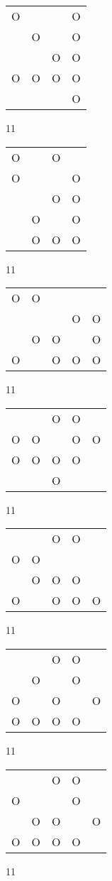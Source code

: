 \begin{tabular}{|m{0.2cm}m{0.2cm}m{0.2cm}m{0.2cm}|}\hline
O& & &O\\
 &O& &O\\
 & &O&O\\
O&O&O&O\\
 & & &O\\
\hline\end{tabular}11
\begin{tabular}{|m{0.2cm}m{0.2cm}m{0.2cm}m{0.2cm}|}\hline
O& &O& \\
O& & &O\\
 & &O&O\\
 &O& &O\\
 &O&O&O\\
\hline\end{tabular}11
\begin{tabular}{|m{0.2cm}m{0.2cm}m{0.2cm}m{0.2cm}m{0.2cm}|}\hline
O&O& & & \\
 & & &O&O\\
 &O&O& &O\\
O& &O&O&O\\
\hline\end{tabular}11
\begin{tabular}{|m{0.2cm}m{0.2cm}m{0.2cm}m{0.2cm}m{0.2cm}|}\hline
 & &O&O& \\
O&O& &O&O\\
O&O&O&O& \\
 & &O& & \\
\hline\end{tabular}11
\begin{tabular}{|m{0.2cm}m{0.2cm}m{0.2cm}m{0.2cm}m{0.2cm}|}\hline
 & &O&O& \\
O&O& & & \\
 &O&O&O& \\
O& &O&O&O\\
\hline\end{tabular}11
\begin{tabular}{|m{0.2cm}m{0.2cm}m{0.2cm}m{0.2cm}m{0.2cm}|}\hline
 & &O&O& \\
 &O& &O& \\
O& &O& &O\\
O&O&O&O& \\
\hline\end{tabular}11
\begin{tabular}{|m{0.2cm}m{0.2cm}m{0.2cm}m{0.2cm}m{0.2cm}|}\hline
 & &O&O& \\
O& & &O& \\
 &O&O& &O\\
O&O&O&O& \\
\hline\end{tabular}11
